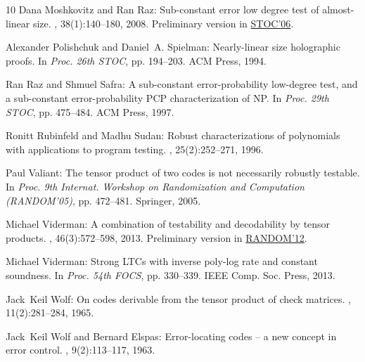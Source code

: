 \documentclass[11pt]{article}
\numberwithin{equation}{section}
\theoremstyle{definition}
\theoremstyle{plain}
\theoremstyle{plain}
\begin{document}
\begin{thebibliography}{10}
{\sc Dana Moshkovitz and Ran Raz}: Sub-constant error low degree test of
  almost-linear size.
, 38(1):140--180, 2008.
\newblock Preliminary version in
  \href{https://doi.org/10.1145/1132516.1132520}{STOC'06}.
\newblock [\epfmtdoi{10.1137/060656838}]

{\sc Alexander Polishchuk and Daniel~A. Spielman}: Nearly-linear size
  holographic proofs.
\newblock In {\em Proc. 26th STOC}, pp. 194--203. ACM Press, 1994.
\newblock [\epfmtdoi{10.1145/195058.195132}]

{\sc Ran Raz and Shmuel Safra}: A sub-constant error-probability low-degree
  test, and a sub-constant error-probability {PCP} characterization of {NP}.
\newblock In {\em Proc. 29th STOC}, pp. 475--484. ACM Press, 1997.
\newblock [\epfmtdoi{10.1145/258533.258641}]

{\sc Ronitt Rubinfeld and Madhu Sudan}: Robust characterizations of polynomials
  with applications to program testing.
, 25(2):252--271, 1996.
\newblock [\epfmtdoi{10.1137/S0097539793255151}]

{\sc Paul Valiant}: The tensor product of two codes is not necessarily robustly
  testable.
\newblock In {\em Proc. 9th Internat. Workshop on Randomization and Computation
  (RANDOM'05)}, pp. 472--481. Springer, 2005.
\newblock [\epfmtdoi{10.1007/11538462\_40}]

{\sc Michael Viderman}: A combination of testability and decodability by tensor
  products.
, 46(3):572--598, 2013.
\newblock Preliminary version in
  \href{https://doi.org/10.1007/978-3-642-32512-0\_55}{RANDOM'12}.

{\sc Michael Viderman}: Strong {LTC}s with inverse poly-log rate and constant
  soundness.
\newblock In {\em Proc. 54th FOCS}, pp. 330--339. IEEE Comp. Soc. Press, 2013.

{\sc Jack~Keil Wolf}: On codes derivable from the tensor product of check
  matrices.
, 11(2):281--284, 1965.

{\sc Jack~Keil Wolf and Bernard Elspas}: Error-locating codes -- a new concept
  in error control.
, 9(2):113--117, 1963.

\end{thebibliography}
\end{document}
